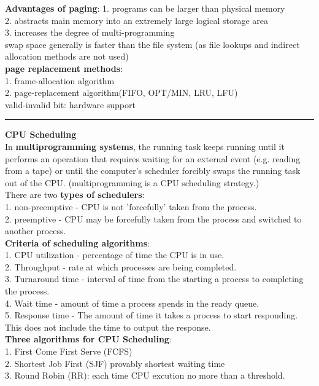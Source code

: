 \documentclass[8pt,a4paper,landscape]{article}
\newcommand{\topic}[1]{\textbf{\large #1}}
\begin{document}
\begin{spacing}{-1}
\begin{multicols*}{3}
\textbf{Advantages of paging}:
1. programs can be larger than physical memory \\
2. abstracts main memory into an extremely large logical storage area \\
3. increases the degree of multi-programming \\
swap space generally is faster than the file system (as file lookups and indirect allocation methods are not used) \\
\textbf{page replacement methods}: \\
1. frame-allocation algorithm \\
2. page-replacement algorithm(FIFO, OPT/MIN, LRU, LFU)\\
valid-invalid bit: hardware support \\
\hrule \noindent
\topic{CPU Scheduling} \\
In \textbf{multiprogramming systems}, the running task keeps running until it performs an operation that requires waiting for an external event (e.g. reading from a tape) or until the computer's scheduler forcibly swaps the running task out of the CPU. (multiprogramming is a CPU scheduling strategy.) \\
There are two \textbf{types of schedulers}: \\
1. non-preemptive - CPU is not 'forcefully' taken from the process. \\
2. preemptive - CPU may be forcefully taken from the process and switched to another process. \\
\textbf{Criteria of scheduling algorithms}: \\
1. CPU utilization - percentage of time the CPU is in use. \\
2. Throughput - rate at which processes are being completed. \\
3. Turnaround time - interval of time from the starting a process to completing the process. \\
4. Wait time - amount of time a process spends in the ready queue. \\
5. Response time - The amount of time it takes a process to start responding. This does not include the time to output the
response. \\
\textbf{Three algorithms for CPU Scheduling}: \\ 
1. First Come First Serve (FCFS) \\
2. Shortest Job First (SJF) provably shortest waiting time \\
3. Round Robin (RR): each time CPU excution no more than a threshold. \\


\end{multicols*}
\end{spacing}
\end{document}

